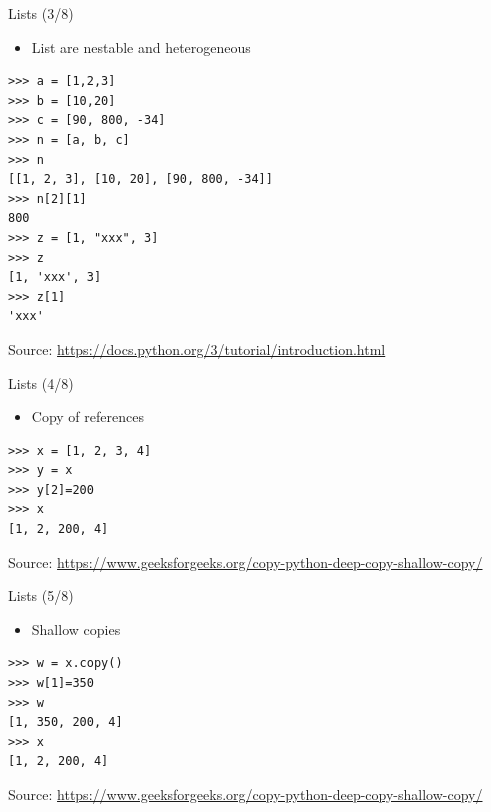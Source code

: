 \documentclass{beamer}
\begin{document}
\begin{frame}[fragile]
{\centerline{Lists (3/8)}}
\begin{itemize}
    \item List are nestable and heterogeneous 
\end{itemize} 
\begin{lstlisting}[style=myPythonStyle]
>>> a = [1,2,3] 
>>> b = [10,20]
>>> c = [90, 800, -34]
>>> n = [a, b, c]
>>> n
[[1, 2, 3], [10, 20], [90, 800, -34]]
>>> n[2][1]
800
>>> z = [1, "xxx", 3]
>>> z
[1, 'xxx', 3]
>>> z[1]
'xxx'
\end{lstlisting}


\begin{center}
\tiny Source: \url{https://docs.python.org/3/tutorial/introduction.html}
\end{center}

\end{frame}



\begin{frame}[fragile]
{\centerline{Lists (4/8)}}
\begin{itemize}
    \item Copy of references
\end{itemize} 
\begin{lstlisting}[style=myPythonStyle]
>>> x = [1, 2, 3, 4]
>>> y = x
>>> y[2]=200
>>> x
[1, 2, 200, 4]
\end{lstlisting}


\begin{center}
\tiny Source: \url{https://www.geeksforgeeks.org/copy-python-deep-copy-shallow-copy/}
\end{center}

\end{frame}



\begin{frame}[fragile]
{\centerline{Lists (5/8)}}
\begin{itemize}
    \item Shallow copies
\end{itemize} 
\begin{lstlisting}[style=myPythonStyle]
>>> w = x.copy()
>>> w[1]=350
>>> w
[1, 350, 200, 4]
>>> x
[1, 2, 200, 4]
\end{lstlisting}


\begin{center}
\tiny Source: \url{https://www.geeksforgeeks.org/copy-python-deep-copy-shallow-copy/}
\end{center}

\end{frame}
\end{document}
